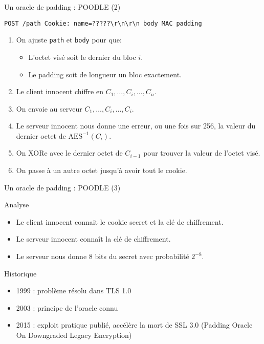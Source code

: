 \documentclass{mpg-ep-slides}
\begin{document}
\begin{frame}[containsverbatim]{Un oracle de padding : POODLE (2)}
  \begin{Verbatim}[gobble=4]
    POST /path Cookie: name=?????\r\n\r\n body MAC padding
  \end{Verbatim}
  \begin{enumerate}
    \item On ajuste \texttt{path} et \texttt{body} pour que:
      \begin{itemize}
        \item L'octet visé soit le dernier du bloc $i$.
        \item Le padding soit de longueur un bloc exactement.
      \end{itemize}
    \item Le client innocent chiffre en $C_1, \dots, C_i, \dots, C_n$.
    \item On envoie au serveur $C_1, \dots, C_i, \dots, C_i$.
    \item Le serveur innocent nous donne une erreur, ou une fois sur 256, la
      valeur du dernier octet de $\text{AES}^{-1}(C_i)$.
    \item On XORe avec le dernier octet de $C_{i-1}$ pour trouver la valeur de
      l'octet visé.
    \item On passe à un autre octet jusqu'à avoir tout le cookie.
  \end{enumerate}
\end{frame}

\begin{frame}{Un oracle de padding : POODLE (3)}
  \begin{block}{Analyse}
    \begin{itemize}
      \item Le client innocent connait le cookie secret et la clé de
        chiffrement.
      \item Le serveur innocent connaît la clé de chiffrement.
      \item Le serveur nous donne 8 bits du secret avec probabilité $2^{-8}$.
    \end{itemize}
  \end{block}

  \begin{block}{Historique}
    \begin{itemize}
      \item 1999 : problème résolu dans TLS 1.0
      \item 2003 : principe de l'oracle connu
      \item 2015 : exploit pratique publié, accélère la mort de SSL 3.0
        (Padding Oracle On Downgraded Legacy Encryption)
    \end{itemize}
  \end{block}
\end{frame}
\end{document}
